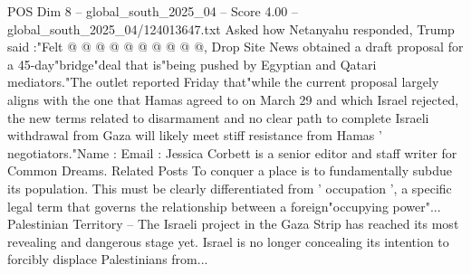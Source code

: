 \begin{textsample}{POS Dim 8 – global\_south\_2025\_04 – Score 4.00 – global\_south\_2025\_04/124013647.txt}
Asked how Netanyahu responded, Trump said :"Felt @ @ @ @ @ @ @ @ @ @, Drop Site News obtained a draft proposal for a 45-day"bridge"deal that is"being pushed by Egyptian and Qatari mediators."The outlet reported Friday that"while the current proposal largely aligns with the one that Hamas agreed to on March 29 and which Israel rejected, the new terms related to disarmament and no clear path to complete Israeli withdrawal from Gaza will likely meet stiff resistance from Hamas ' negotiators."Name : Email : Jessica Corbett is a senior editor and staff writer for Common Dreams.
Related Posts To conquer a place is to fundamentally subdue its population.
This must be clearly differentiated from ' occupation ', a specific legal term that governs the relationship between a foreign"occupying power"...
Palestinian Territory -- The Israeli project in the Gaza Strip has reached its most revealing and dangerous stage yet.
Israel is no longer concealing its intention to forcibly displace Palestinians from...

\end{textsample}
